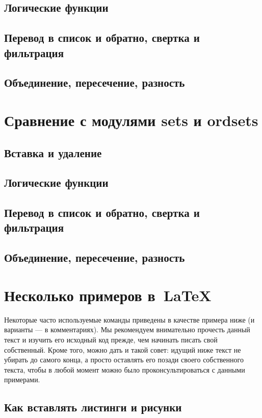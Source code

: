 			
	\subsection{Логические функции}	
	\subsection{Перевод в список и обратно, свертка и фильтрация}
	\subsection{Объединение, пересечение, разность}


\section{Сравнение с модулями sets и ordsets}
	\subsection{Вставка и удаление}
	\subsection{Логические функции}
	\subsection{Перевод в список и обратно, свертка и фильтрация}
	\subsection{Объединение, пересечение, разность}

\section{Несколько примеров в~\LaTeX{}}
\label{sec:examples}

Некоторые часто используемые
команды приведены в качестве примера ниже (и варианты — в
комментариях). Мы рекомендуем внимательно прочесть данный
текст и изучить его исходный код прежде, чем начинать писать
свой собственный. Кроме того, можно дать и такой совет: идущий
ниже текст не убирать до самого конца, а просто оставлять его
позади своего собственного текста, чтобы в любой момент можно
было проконсультироваться с данными примерами.

\subsection{Как вставлять листинги и рисунки}

